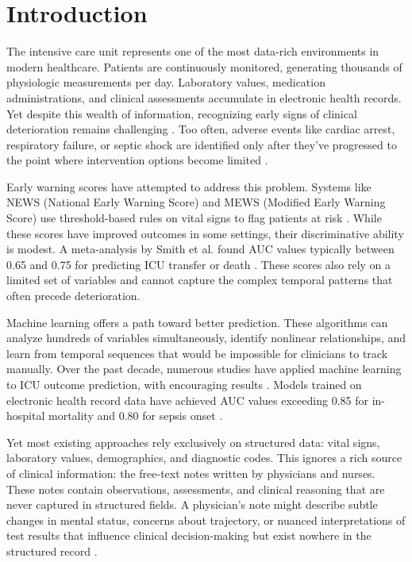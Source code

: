 \section{Introduction}

The intensive care unit represents one of the most data-rich environments in modern healthcare. Patients are continuously monitored, generating thousands of physiologic measurements per day. Laboratory values, medication administrations, and clinical assessments accumulate in electronic health records. Yet despite this wealth of information, recognizing early signs of clinical deterioration remains challenging \citep{Churpek2016}. Too often, adverse events like cardiac arrest, respiratory failure, or septic shock are identified only after they've progressed to the point where intervention options become limited \citep{Hillman2014}.

Early warning scores have attempted to address this problem. Systems like NEWS (National Early Warning Score) and MEWS (Modified Early Warning Score) use threshold-based rules on vital signs to flag patients at risk \citep{Smith2013}. While these scores have improved outcomes in some settings, their discriminative ability is modest. A meta-analysis by Smith et al. found AUC values typically between 0.65 and 0.75 for predicting ICU transfer or death \citep{Smith2014}. These scores also rely on a limited set of variables and cannot capture the complex temporal patterns that often precede deterioration.

Machine learning offers a path toward better prediction. These algorithms can analyze hundreds of variables simultaneously, identify nonlinear relationships, and learn from temporal sequences that would be impossible for clinicians to track manually. Over the past decade, numerous studies have applied machine learning to ICU outcome prediction, with encouraging results \citep{Rajkomar2018, Shickel2018}. Models trained on electronic health record data have achieved AUC values exceeding 0.85 for in-hospital mortality and 0.80 for sepsis onset \citep{Henry2015, Nemati2018}.

Yet most existing approaches rely exclusively on structured data: vital signs, laboratory values, demographics, and diagnostic codes. This ignores a rich source of clinical information: the free-text notes written by physicians and nurses. These notes contain observations, assessments, and clinical reasoning that are never captured in structured fields. A physician's note might describe subtle changes in mental status, concerns about trajectory, or nuanced interpretations of test results that influence clinical decision-making but exist nowhere in the structured record \citep{Weissman2018}.

